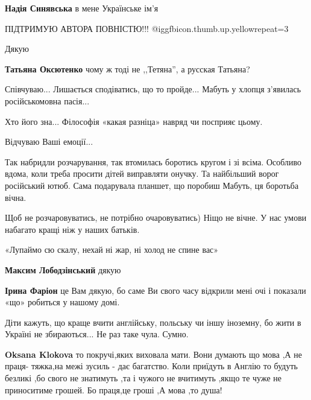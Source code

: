 \begin{itemize}
\begin{itemize}
\textbf{Надія Синявська} в мене Українське ім'я
\end{itemize} %

ПІДТРИМУЮ АВТОРА ПОВНІСТЮ!!! @igg{fbicon.thumb.up.yellow}{repeat=3} 

\begin{itemize} %
Дякую

\textbf{Татьяна Оксютенко} чому ж тоді не ,,Тетяна'', а русская Татьяна?
\end{itemize} %

Співчуваю... Лишається сподіватись, що то пройде... Мабуть у хлопця з'явилась російськомовна пасія...

\begin{itemize} %
Хто його зна... Філософія «какая разніца» навряд чи посприяє цьому.
\end{itemize} %

Відчуваю Ваші емоції...


Так набридли розчарування, так втомилась боротись кругом і зі всіма. Особливо
вдома, коли треба просити дітей виправляти онучку. Та найбільший ворог російський
ютюб. Сама подарувала планшет, що поробиш Мабуть, ця боротьба вічна.

\begin{itemize} %

Щоб не розчаровуватись, не потрібно очаровуватись) Ніщо не вічне. У нас умови
набагато кращі ніж у наших батьків.

«Лупаймо сю скалу, нехай ні жар, ні холод не спине вас»


\textbf{Максим Лободзінський} дякую

\textbf{Ірина Фаріон} це Вам дякую, бо саме Ви свого часу відкрили мені очі і показали «що» робиться у нашому домі.
\end{itemize} %


Діти кажуть, що краще вчити англійську, польську чи іншу іноземну, бо жити в
Україні не збираються... Не раз таке чула. Сумно.

\begin{itemize} %
\textbf{Oksana Klokova} то покручі,яких виховала мати.
Вони думають що мова ,А не праця- тяжка,на межі зусиль - дає багатство.
Коли приїдуть в Англію то будуть безликі ,бо свого не знатимуть ,та і чужого не вчитимуть ,якщо те чуже не приноситиме грошей.
Бо праця,це гроші ,А мова ,то душа!


\end{itemize}
\end{itemize}
